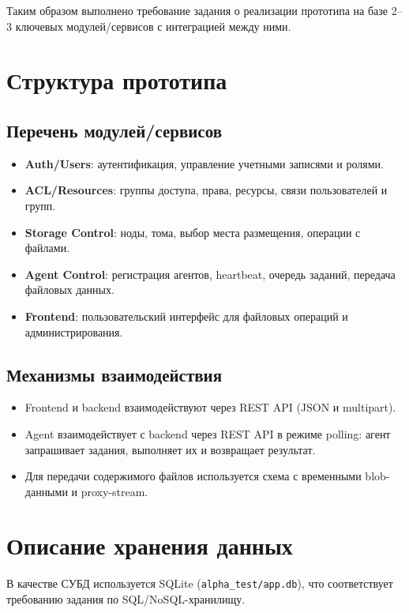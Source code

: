 \documentclass[14pt,a4paper]{extarticle}
\begin{document}
Таким образом выполнено требование задания о реализации прототипа на базе 2--3 ключевых модулей/сервисов с интеграцией между ними.

\section{Структура прототипа}
\subsection{Перечень модулей/сервисов}
\begin{itemize}
    \item \textbf{Auth/Users}: аутентификация, управление учетными записями и ролями.
    \item \textbf{ACL/Resources}: группы доступа, права, ресурсы, связи пользователей и групп.
    \item \textbf{Storage Control}: ноды, тома, выбор места размещения, операции с файлами.
    \item \textbf{Agent Control}: регистрация агентов, heartbeat, очередь заданий, передача файловых данных.
    \item \textbf{Frontend}: пользовательский интерфейс для файловых операций и администрирования.
\end{itemize}

\subsection{Механизмы взаимодействия}
\begin{itemize}
    \item Frontend и backend взаимодействуют через REST API (JSON и multipart).
    \item Agent взаимодействует с backend через REST API в режиме polling:
    агент запрашивает задания, выполняет их и возвращает результат.
    \item Для передачи содержимого файлов используется схема с временными blob-данными и proxy-stream.
\end{itemize}

\section{Описание хранения данных}
В качестве СУБД используется SQLite (\texttt{alpha\_test/app.db}), что соответствует требованию задания по SQL/NoSQL-хранилищу.
\end{document}
